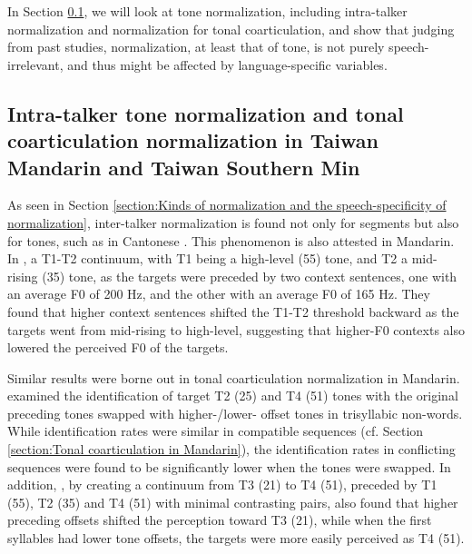 \documentclass[12pt]{report}
\begin{document}
\begin{CJK}{UTF8}{bsmi}
In Section \ref{section:Intra-talker tone normalization and tonal coarticulation normalization in Taiwan Mandarin and Taiwan Southern Min}, we will look at tone normalization, including intra-talker normalization and normalization for tonal coarticulation, and show that judging from past studies, normalization, at least that of tone, is not purely speech-irrelevant, and thus might be affected by language-specific variables.

\subsection{Intra-talker tone normalization and tonal coarticulation normalization in Taiwan Mandarin and Taiwan Southern Min}\label{section:Intra-talker tone normalization and tonal coarticulation normalization in Taiwan Mandarin and Taiwan Southern Min}

As seen in Section \ref{section:Kinds of normalization and the speech-specificity of normalization}, inter-talker normalization is found not only for segments but also for tones, such as in Cantonese \citep{WongDiehl2003}. This phenomenon is also attested in Mandarin. In \cite{HuangHolt2009}, a T1-T2 continuum, with T1 being a high-level (55) tone, and T2 a mid-rising (35) tone, as the targets were preceded by two context sentences, one with an average F0 of 200 Hz, and the other with an average F0 of 165 Hz. They found that higher context sentences shifted the T1-T2 threshold backward as the targets went from mid-rising to high-level, suggesting that higher-F0 contexts also lowered the perceived F0 of the targets. 

Similar results were borne out in tonal coarticulation normalization in Mandarin. \cite{Xu1994} examined the identification of target T2 (25) and T4 (51) tones with the original preceding tones swapped with higher-/lower- offset tones in trisyllabic non-words. While identification rates were similar in compatible sequences (cf. Section \ref{section:Tonal coarticulation in Mandarin}), the identification rates in conflicting sequences were found to be significantly lower when the tones were swapped. In addition, \cite{Zhangetal2022}, by creating a continuum from T3 (21) to T4 (51), preceded by T1 (55), T2 (35) and T4 (51) with minimal contrasting pairs, also found that higher preceding offsets shifted the perception toward T3 (21), while when the first syllables had lower tone offsets, the targets were more easily perceived as T4 (51).


\end{CJK}
\end{document}
